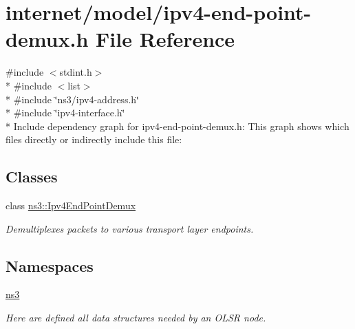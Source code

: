 \hypertarget{ipv4-end-point-demux_8h}{}\section{internet/model/ipv4-\/end-\/point-\/demux.h File Reference}
\label{ipv4-end-point-demux_8h}
{\ttfamily \#include $<$stdint.\+h$>$}\\*
{\ttfamily \#include $<$list$>$}\\*
{\ttfamily \#include \char`\"{}ns3/ipv4-\/address.\+h\char`\"{}}\\*
{\ttfamily \#include \char`\"{}ipv4-\/interface.\+h\char`\"{}}\\*
Include dependency graph for ipv4-\/end-\/point-\/demux.h\+:
This graph shows which files directly or indirectly include this file\+:
\subsection*{Classes}
\begin{DoxyCompactItemize}
\item 
class \hyperlink{classns3_1_1Ipv4EndPointDemux}{ns3\+::\+Ipv4\+End\+Point\+Demux}
\begin{DoxyCompactList}\small\item\em Demultiplexes packets to various transport layer endpoints. \end{DoxyCompactList}\end{DoxyCompactItemize}
\subsection*{Namespaces}
\begin{DoxyCompactItemize}
\item 
 \hyperlink{namespacens3}{ns3}
\begin{DoxyCompactList}\small\item\em Here are defined all data structures needed by an O\+L\+SR node. \end{DoxyCompactList}\end{DoxyCompactItemize}
